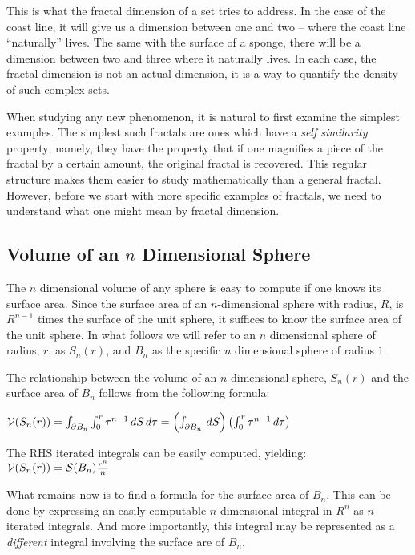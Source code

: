 This is what the fractal dimension of a set tries to address. 
In the case of the coast line, it will give us a dimension between one and two
-- where the coast line ``naturally'' lives. The same with the surface of
a sponge,
there will be a dimension between two and three where it naturally lives. In
each case, the fractal dimension is not an actual dimension, 
it is a way to quantify the density of such complex sets.

When studying any new phenomenon, it is natural to first examine the
simplest examples. The simplest such fractals are ones which have a
{\it self similarity} property; namely, they have the property that if
one magnifies a piece of the fractal by a certain amount, the original
fractal is recovered. This regular structure makes them easier to
study mathematically than a general fractal. However, before we start
with more specific examples of fractals, we need to understand what 
one might mean by fractal dimension.

\subsection{Volume of an $n$ Dimensional Sphere}
The $n$ dimensional volume of any sphere is easy to compute if one 
knows its surface area. Since the surface area of an $n$-dimensional sphere 
with radius, $R$, is $R^{n-1}$ times the surface of the unit sphere, 
it suffices to know the surface area of the unit sphere.
In what follows we will refer to an $n$ dimensional sphere of radius, $r$, 
as $S_n(r)$, and $B_n$ as the specific $n$ dimensional sphere of radius $1$.

The relationship between the volume of an $n$-dimensional sphere, $S_n(r)$ and the 
surface area of $B_n$ follows from the following formula:%

${\cal V}(S_n(r)) =  \int_{\partial B_n} \int_0^r \tau^{n-1} \,dS \,d\tau = \left(\int_{\partial B_n} \, dS\right) \left( \int_0^r \tau^{n-1} \, d\tau \right)$

The RHS iterated integrals can be easily computed, yielding:
${\cal V}(S_n(r)) = {\cal S}(B_n) \frac{r^n}{n}$

What remains now is to find a formula for the surface area of $B_n.$
This can be done by expressing an easily computable 
$n$-dimensional integral in $R^n$ as $n$ iterated integrals. 
And more importantly, this integral may be represented as a {\it different\/} 
integral involving the surface are of $B_n$.

